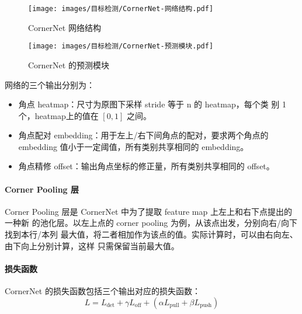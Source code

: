 \begin{figure}[ht]
  \centering
  \texttt{[image: images/目标检测/CornerNet-网络结构.pdf]}
  \caption{CornerNet 网络结构}\label{fig:CornerNet-network}
\end{figure}

\begin{figure}[ht]
  \centering
  \texttt{[image: images/目标检测/CornerNet-预测模块.pdf]}
  \caption{CornerNet 的预测模块}\label{fig:CornerNet-prediction}
\end{figure}

网络的三个输出分别为：

\begin{itemize}
  \item 角点 heatmap：尺寸为原图下采样 stride 等于 n 的 heatmap，每个类
    别 1 个，heatmap上的值在 $[0, 1]$ 之间。
  \item 角点配对 embedding：用于左上/右下间角点的配对，要求两个角点的 embedding
    值小于一定阈值，所有类别共享相同的 embedding。
  \item 角点精修 offset：输出角点坐标的修正量，所有类别共享相同的 offset。
\end{itemize}

\paragraph{Corner Pooling 层}
Corner Pooling 层是 CornerNet 中为了提取 feature map 上左上和右下点提出的一种新
的池化层。以左上点的 corner pooling 为例，从该点出发，分别向右/向下找到本行/本列
最大值，将二者相加作为该点的值。实际计算时，可以由右向左、由下向上分别计算，这样
只需保留当前最大值。

\paragraph{损失函数}
CornerNet 的损失函数包括三个输出对应的损失函数：
\begin{equation}\label{eq:cornernet-loss}
  L = L_{\det} + \gamma L_{\mathrm{off}} + (\alpha L_{\mathrm{pull}} + \beta L_{\mathrm{push}})
\end{equation}

